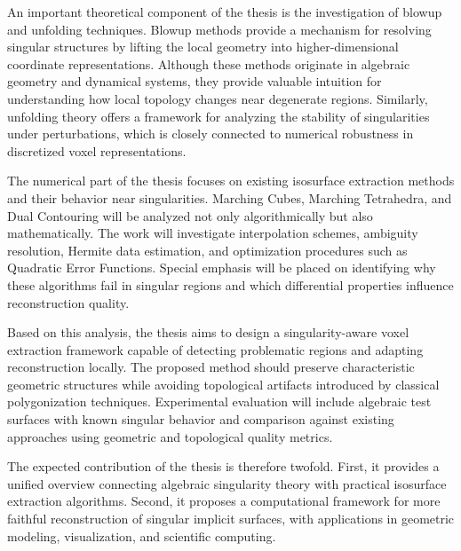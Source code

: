 \documentclass[12pt,a4paper]{article}
\begin{document}
An important theoretical component of the thesis is the investigation of blowup and unfolding techniques. Blowup methods provide a mechanism for resolving singular structures by lifting the local geometry into higher-dimensional coordinate representations. Although these methods originate in algebraic geometry and dynamical systems, they provide valuable intuition for understanding how local topology changes near degenerate regions. Similarly, unfolding theory offers a framework for analyzing the stability of singularities under perturbations, which is closely connected to numerical robustness in discretized voxel representations.

The numerical part of the thesis focuses on existing isosurface extraction methods and their behavior near singularities. Marching Cubes, Marching Tetrahedra, and Dual Contouring will be analyzed not only algorithmically but also mathematically. The work will investigate interpolation schemes, ambiguity resolution, Hermite data estimation, and optimization procedures such as Quadratic Error Functions. Special emphasis will be placed on identifying why these algorithms fail in singular regions and which differential properties influence reconstruction quality.

Based on this analysis, the thesis aims to design a singularity-aware voxel extraction framework capable of detecting problematic regions and adapting reconstruction locally. The proposed method should preserve characteristic geometric structures while avoiding topological artifacts introduced by classical polygonization techniques. Experimental evaluation will include algebraic test surfaces with known singular behavior and comparison against existing approaches using geometric and topological quality metrics.

The expected contribution of the thesis is therefore twofold. First, it provides a unified overview connecting algebraic singularity theory with practical isosurface extraction algorithms. Second, it proposes a computational framework for more faithful reconstruction of singular implicit surfaces, with applications in geometric modeling, visualization, and scientific computing.
\end{document}
